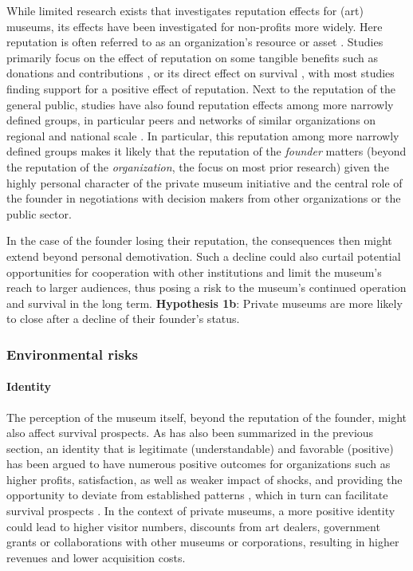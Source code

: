 \documentclass[12pt]{article}
\begin{document}
While limited research exists that investigates reputation effects for (art) museums, its effects have been investigated for non-profits more widely.
Here reputation is often referred to as an organization's resource or asset \parencite{Walker_McCarthy_2010_survival,Schloderer_Sarstedt_Ringle_2014_reputation}. 
Studies primarily focus on the effect of reputation on some tangible benefits such as donations and contributions \parencite{Sarstedt_2010_reputation,Mews_Boenigk_2012_blood,Heller_2008_alliances,Meijer_2009_reputation}, or its direct effect on survival \parencite{Lu_Shon_Zhang_2019_dissolution,Singh_1991_change,Hager_2001_vulnerability,Bielefeld_1994_survival,HernandezOrtiz_2022_discontinuity}, with most studies finding support for a positive effect of reputation.
Next to the reputation of the general public, studies have also found reputation effects among more narrowly defined groups, in particular peers \parencite{Padanyi_Gainer_2003_peerreputation} and networks of similar organizations on regional and national scale \parencite{Walker_McCarthy_2010_survival}.
In particular, this reputation among more narrowly defined groups makes it likely that the reputation of the \emph{founder} matters (beyond the reputation of the \emph{organization}, the focus on most prior research) given the highly personal character of the private museum initiative and the central role of the founder in negotiations with decision makers from other organizations or the public sector.


In the case of the founder losing their reputation, the consequences then might extend beyond personal demotivation.
Such a decline could also curtail potential opportunities for cooperation with other institutions and limit the museum's reach to larger audiences, thus posing a risk to the museum's continued operation and survival in the long term.
\bigbreak
\noindent
\textbf{Hypothesis 1b}: Private museums are more likely to close after a decline of their founder's status.
\subsubsection*{Environmental risks}



\paragraph*{Identity}

The perception of the museum itself, beyond the reputation of the founder, might also affect survival prospects.
As has also been summarized in the previous section, an identity that is legitimate (understandable) and favorable (positive) has been argued to have numerous positive outcomes for organizations such as higher profits, satisfaction, as well as weaker impact of shocks, and providing the opportunity to deviate from established patterns \parencite{Lange_Lee_Dai_2010_reputation}, which in turn can facilitate survival prospects \parencite{Rao_1994_reputation}.
In the context of private museums, a more positive identity could lead to higher visitor numbers, discounts from art dealers, government grants or collaborations with other museums or corporations, resulting in higher revenues and lower acquisition costs.
\end{document}
